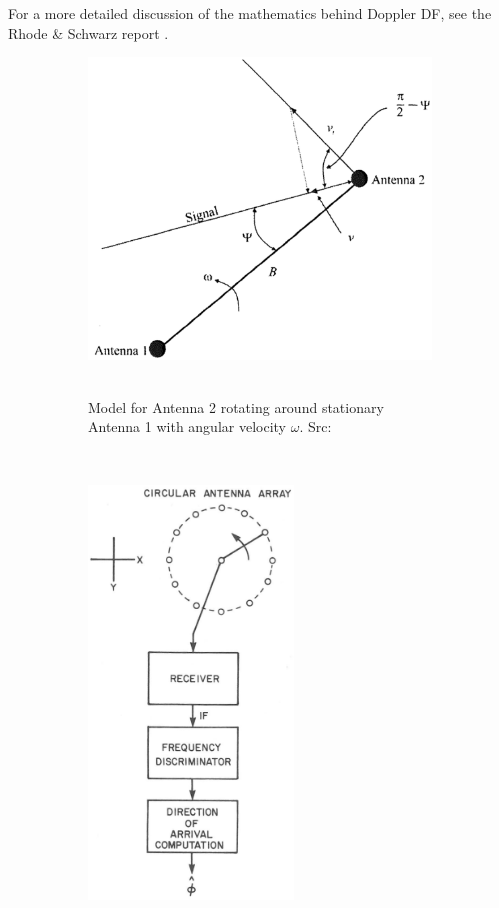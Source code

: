 For a more detailed discussion of the mathematics behind Doppler DF, see the Rhode \& Schwarz report \cite{rhode2000introtodf}. 
\begin{figure}
  \centering
  \begin{subfigure}[b]{0.48\textwidth}
    \centering
    \includegraphics[width=\textwidth]{./img/lit_review/doppler-2-antenna}
    ~ 
    \caption{Model for Antenna 2 rotating around stationary Antenna 1 with angular velocity \(\omega\). Src: \cite{poisel2012electronic}}
  \end{subfigure}
  ~
  \begin{subfigure}[b]{0.48\textwidth}
    \centering
    \includegraphics[width=0.6\textwidth]{./img/lit_review/doppler-switching}

\end{subfigure}
\end{figure}
